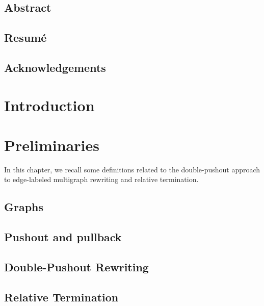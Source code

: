 \documentclass{report}
\begin{document}
  
   
  

\newpage
\section*{Abstract}


\newpage
\section*{Resumé}
 
 
\newpage 
\section*{Acknowledgements}

\newpage       
 
  
\tableofcontents   
\newpage      

\chapter{Introduction}  


\chapter{Preliminaries}
In this chapter, we recall some definitions related to the double-pushout approach to edge-labeled multigraph rewriting and relative termination. 
\section{Graphs}
 
\section{Pushout and pullback}  

\section{Double-Pushout Rewriting}
\label{sec:dpo}
 
\section{Relative Termination}

\end{document}
